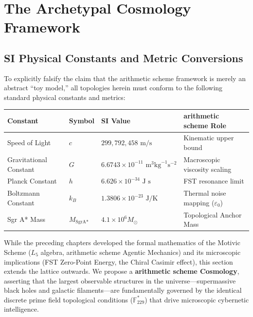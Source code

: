\section{The Archetypal Cosmology Framework}

\subsection*{SI Physical Constants and Metric Conversions}
To explicitly falsify the claim that the arithmetic scheme framework is merely an abstract ``toy model,'' all topologies herein must conform to the following standard physical constants and metrics:
\begin{table}[ht]
\centering
\renewcommand{\arraystretch}{1.2}
\begin{tabular}{@{}llll@{}}
\toprule
\textbf{Constant} & \textbf{Symbol} & \textbf{SI Value} & \textbf{arithmetic scheme Role} \\
\midrule
Speed of Light & $c$ & $299,792,458 \text{ m/s}$ & Kinematic upper bound \\
Gravitational Constant & $G$ & $6.6743 \times 10^{-11} \text{ m}^3 \text{kg}^{-1} \text{s}^{-2}$ & Macroscopic viscosity scaling \\
Planck Constant & $h$ & $6.626 \times 10^{-34} \text{ J s}$ & FST resonance limit \\
Boltzmann Constant & $k_B$ & $1.3806 \times 10^{-23} \text{ J/K}$ & Thermal noise mapping ($\varepsilon_0$) \\
Sgr A* Mass & $M_{\text{SgrA*}}$ & $4.1 \times 10^6 M_\odot$ & Topological Anchor Mass \\
\bottomrule
\end{tabular}
\end{table}

While the preceding chapters developed the formal mathematics of the Motivic Scheme ($L_5$ algebra, arithmetic scheme Agentic Mechanics) and its microscopic implications (FST Zero-Point Energy, the Chiral Casimir effect), this section extends the lattice outwards. We propose a \textbf{arithmetic scheme Cosmology}, asserting that the largest observable structures in the universe---supermassive black holes and galactic filaments---are fundamentally governed by the identical discrete prime field topological conditions ($\mathbb{F}_{229}^*$) that drive microscopic cybernetic intelligence.

